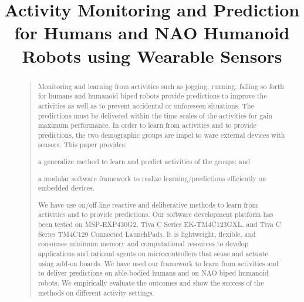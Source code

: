 \documentclass[letterpaper]{article}
\begin{document}
%
\title{Activity Monitoring and Prediction for Humans and NAO Humanoid Robots using 
Wearable Sensors}
\maketitle
\begin{abstract}
\begin{quote}
Monitoring and learning from activities such as jogging, running, falling so forth for humans and 
humanoid biped robots provide predictions to improve the activities as well as to prevent 
accidental or unforeseen situations. The predictions must be delivered within the time scales of 
the activities for gain maximum performance. In order to learn from activities and to provide 
predictions, the two demographic groups are impel to ware external devices with sensors. This 
paper provides: \begin{inparaenum}[1)] \item a generalize method to learn and predict activities 
of the groups; and \item a modular software framework to realize learning/predictions 
efficiently on embedded devices. \end{inparaenum} We have use on/off-line reactive and deliberative 
methods to learn from activities and to provide predictions. Our software development platform has 
been tested on MSP-EXP430G2, Tiva C Series EK-TM4C123GXL, and Tiva C Series TM4C129 Connected 
LaunchPads. It is lightweight, flexible, and consumes minimum memory and computational 
resources to develop applications and rational agents on microcontrollers that sense and actuate 
using add-on boards. We have used our framework to learn from activities and to deliver predictions 
on able-bodied humans and on NAO biped humanoid robots. We empirically evaluate the outcomes and 
show the success of the methods on different activity settings. 
\end{quote}
\end{abstract}
\end{document}
